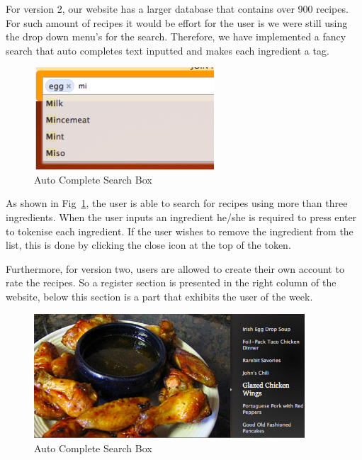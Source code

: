For version 2, our website has a larger database that contains over 900 recipes. For such amount of recipes it would be effort for the user is we were still using the drop down menu's for the search. Therefore, we have implemented a fancy search that auto completes text inputted and makes each ingredient a tag. 

\begin{figure}[h]
\begin{center}
\includegraphics[width=0.6\textwidth]{auto_complete}
\caption{Auto Complete Search Box}
\label{fig:auto_complete}
\end{center}
\end{figure}

As shown in Fig~\ref{fig:auto_complete}, the user is able to search for recipes using more than three ingredients. When the user inputs an ingredient he/she is required to press enter to tokenise each ingredient. If the user wishes to remove the ingredient from the list, this is done by clicking the close icon at the top of the token. 

Furthermore, for version two, users are allowed to create their own account to rate the recipes. So a register section is presented in the right column of the website, below this section is a part that exhibits the user of the week. 

\begin{figure}[H]
\begin{center}
\includegraphics[width=0.9\textwidth]{slideshow}
\caption{Auto Complete Search Box}
\label{fig:slideshow}
\end{center}
\end{figure}

